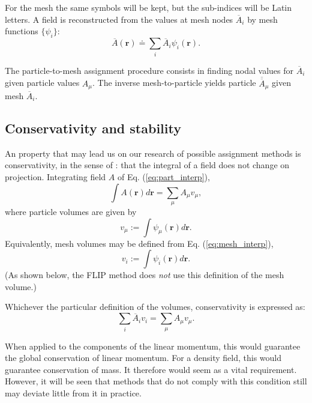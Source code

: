 \documentclass{ws-ijcm}
\newcommand{\bfr}{\mathbf{r}}
\newcommand*{\Ab}{\overline{A}}
\newcommand*{\Abb}{\overline{\overline{A}}}
\begin{document}
For the mesh the same symbols will be kept, but the sub-indices will
be Latin letters. A field is reconstructed from the values at mesh
nodes $\Ab_i$ by mesh functions $\{\psi_i\}$:
\begin{equation}
\label{eq:mesh_interp}
\Ab(\bfr) \doteq \sum_i \Ab_i \psi_i ( \bfr ) .
\end{equation}

The particle-to-mesh assignment procedure consists in finding nodal
values for $\Ab_i$ given particle values $A_\mu$. The inverse
mesh-to-particle yields particle $\Abb_\mu$ given mesh $\Ab_i$.




\subsection{Conservativity and stability}
\label{sec:cons_stab}

An property that may lead us on our research of possible assignment
methods is conservativity, in the sense of \cite{cottet2000}: that the
integral of a field does not change on projection. Integrating field
$A$ of Eq. (\ref{eq:part_interp}),
\[
\int A(\bfr) d\bfr  =  \sum_\mu A_\mu v_\mu ,
\]
where particle volumes are given by
\begin{equation}
  \label{eq:part_v}
  v_\mu := \int \psi_\mu(\bfr) d\bfr .
\end{equation}
%
Equivalently, mesh volumes may be defined from
Eq. (\ref{eq:mesh_interp}),
\begin{equation}
  \label{eq:mesh_v}
  v_i := \int \psi_i(\bfr) d\bfr .
\end{equation}
(As shown below, the FLIP method does \emph{not} use this definition
of the mesh volume.)


Whichever the particular definition of the volumes, conservativity is
expressed as:
\begin{equation}
\label{eq:cons}
\sum_i \Ab_i v_i = \sum_\mu A_\mu v_\mu .
\end{equation}

When applied to the components of the linear momentum, this would
guarantee the global conservation of linear momentum. For a density
field, this would guarantee conservation of mass. It therefore would
seem as a vital requirement. However, it will be seen that methods
that do not comply with this condition still may deviate little from
it in practice.
\end{document}
